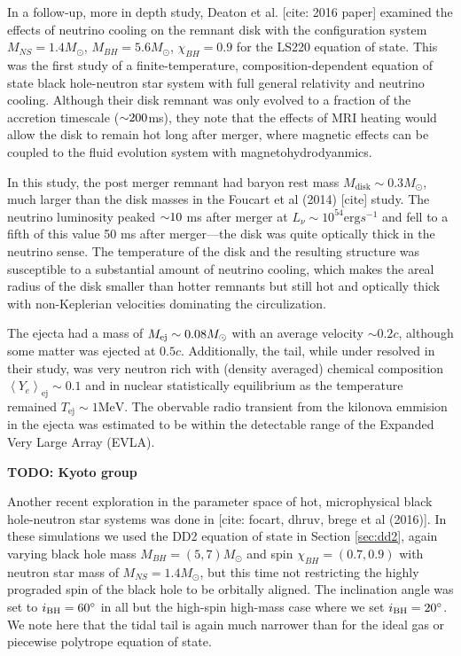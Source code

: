 
In a follow-up, more in depth study, Deaton et al. [cite: 2016 paper] examined the effects of neutrino cooling on the remnant disk with the configuration system $M_{NS} = 1.4 M_\odot$, $M_{BH} = 5.6 M_\odot$, $\chi_{BH} = 0.9$ for the LS220 equation of state.  This was the first study of a finite-temperature, composition-dependent equation of state black hole-neutron star system with full general relativity and neutrino cooling.  Although their disk remnant was only evolved to a fraction of the accretion timescale ($\mathord{\sim} 200$ms), they note that the effects of MRI heating would allow the disk to remain hot long after merger, where magnetic effects can be coupled to the fluid evolution system with magnetohydrodyanmics.


In this study, the post merger remnant had baryon rest mass $M_\textrm{disk} \sim 0.3 M_\odot$, much larger than the disk masses in the Foucart et al (2014) [cite] study.  The neutrino luminosity peaked $\mathord{\sim} 10$ ms after merger at $L_\nu \sim 10^{54} \textrm{erg} s^{-1}$ and fell to a fifth of this value 50 ms after merger---the disk was quite optically thick in the neutrino sense.  The temperature of the disk and the resulting structure was susceptible to a substantial amount of neutrino cooling, which makes the areal radius of the disk smaller than hotter remnants but still hot and optically thick with non-Keplerian velocities dominating the circulization.

The ejecta had a mass of $M_{\rm ej} \sim 0.08 M_\odot$ with an average velocity $\sim 0.2 c$, although some matter was ejected at $0.5 c$. Additionally, the tail, while under resolved in their study, was very neutron rich with (density averaged) chemical composition $\left\langle Y_e \right\rangle_\textrm{ej} \sim 0.1$  and in nuclear statistically equilibrium as the temperature remained $T_\textrm{ej} \sim 1 \textrm{MeV}$.  The obervable radio transient from the kilonova emmision in the ejecta was estimated to be within the detectable range of the Expanded Very Large Array (EVLA).


\textbf{TODO: Kyoto group}


Another recent exploration in the parameter space of hot, microphysical black hole-neutron star systems was done in [cite: focart, dhruv, brege et al (2016)].  In these simulations we used the DD2 equation of state in Section \ref{sec:dd2}, again varying black hole mass $M_{BH} = (5, 7) M_\odot$ and spin $\chi_{BH} = (0.7, 0.9)$ with neutron star mass of $M_{NS} = 1.4 M_\odot$, but this time not restricting the highly prograded spin of the black hole to be orbitally aligned.  The inclination angle was set to $i_{\rm BH}=60^{\circ}$ in all but the high-spin high-mass case where we set $i_{\rm BH}=20^{\circ}$.  We note here that the tidal tail is again much narrower than for the ideal gas or piecewise polytrope equation of state.  


